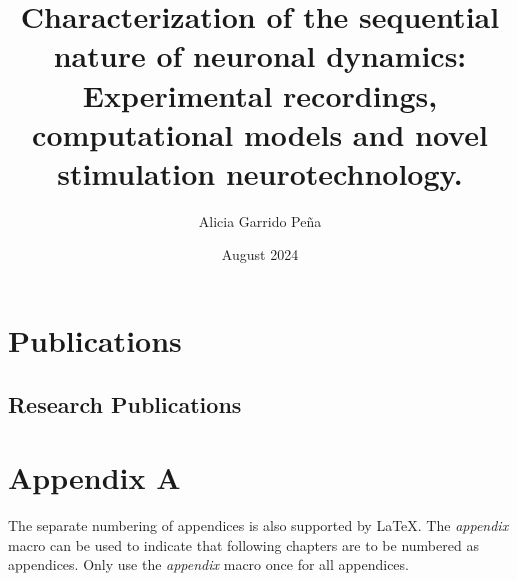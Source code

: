\documentclass[11pt,a4paper,twoside]{book} %
\title{Characterization of the sequential nature of neuronal dynamics: Experimental recordings, computational models and novel stimulation neurotechnology.}
\author{Alicia Garrido Peña}
\date{August 2024}
\numberwithin{equation}{section}
\begin{document}
\maketitle

% 
% 
% 
\newpage
\clearpage
\newpage





\tableofcontents
\listoftables
\listoffigures
%

\newpage



\resetpagenumbering


%
%
%
%
%
%


\printbibliography


\begin{appendix}
\chapter{Publications}
 \section{Research Publications}


\begin{refsection}
\nocite{*}

\printbibliography[heading={subbibliography},title={Journal Publications},type=article,resetnumbers=true]

\printbibliography[heading={subbibliography},title={Conference Proceedings},type=inproceedings]


\end{refsection}
\chapter{Appendix A}
The separate numbering of appendices is also supported by LaTeX. The \textit{appendix} macro can be used to indicate that following chapters are to be numbered as appendices. Only use the \textit{appendix} macro once for all appendices.


% 


\end{appendix}
\end{document}
